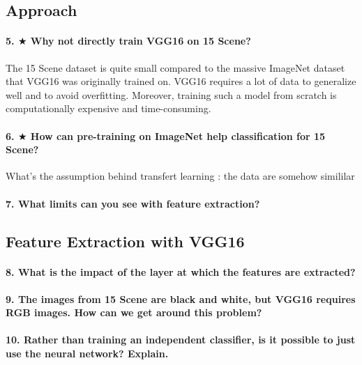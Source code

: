 \subsection{Approach}
\paragraph{5. $\bigstar$ Why not directly train VGG16 on 15 Scene?}
The 15 Scene dataset is quite small compared to the massive ImageNet dataset that VGG16 was originally trained on. VGG16 requires a lot of data to generalize well and to avoid overfitting. Moreover, training such a model from scratch is computationally expensive and time-consuming.


\paragraph{6. $\bigstar$ How can pre-training on ImageNet help classification for 15 Scene?}
What's the assumption behind transfert learning : the data are somehow simililar 

\paragraph{7. What limits can you see with feature extraction?}


\subsection{Feature Extraction with VGG16}
\paragraph{8. What is the impact of the layer at which the features are extracted?}


\paragraph{9. The images from 15 Scene are black and white, but VGG16 requires RGB images. How can we get around this problem?}


\paragraph{10. Rather than training an independent classifier, is it possible to just use the neural network? Explain.}